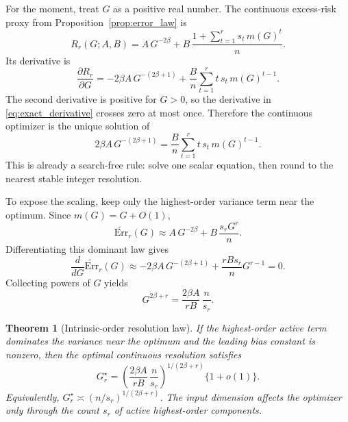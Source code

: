 \documentclass{article}
\newcommand{\Err}{\mathrm{Err}}
\newtheorem{theorem}{Theorem}
\begin{document}
For the moment, treat $G$ as a positive real number. The continuous excess-risk proxy from Proposition~\ref{prop:error_law} is
\begin{equation}
    R_r(G;A,B)=A\,G^{-2\beta}+B\,\frac{1+\sum_{t=1}^{r}s_t\,m(G)^t}{n}.
    \label{eq:exact_proxy_risk}
\end{equation}
Its derivative is
\begin{equation}
    \frac{\partial R_r}{\partial G}
    = -2\beta A\,G^{-(2\beta+1)}
      + \frac{B}{n}\sum_{t=1}^{r} t\,s_t\,m(G)^{t-1}.
    \label{eq:exact_derivative}
\end{equation}
The second derivative is positive for $G>0$, so the derivative in \eqref{eq:exact_derivative} crosses zero at most once. Therefore the continuous optimizer is the unique solution of
\begin{equation}
    2\beta A\,G^{-(2\beta+1)}
    = \frac{B}{n}\sum_{t=1}^{r} t\,s_t\,m(G)^{t-1}.
    \label{eq:root_equation}
\end{equation}
This is already a search-free rule: solve one scalar equation, then round to the nearest stable integer resolution.

To expose the scaling, keep only the highest-order variance term near the optimum. Since $m(G)=G+O(1)$,
\begin{equation}
    \widetilde{\Err}_r(G) \approx A\,G^{-2\beta}+B\,\frac{s_rG^r}{n}.
    \label{eq:dominant_law}
\end{equation}
Differentiating this dominant law gives
\begin{equation}
    \frac{d}{dG}\widetilde{\Err}_r(G)
    \approx -2\beta A\,G^{-(2\beta+1)}+\frac{rB s_r}{n}G^{r-1}=0.
    \label{eq:derivative}
\end{equation}
Collecting powers of $G$ yields
\[
    G^{2\beta+r}=\frac{2\beta A}{rB}\,\frac{n}{s_r}.
\]

\begin{theorem}[Intrinsic-order resolution law]
\label{thm:resolution_law}
If the highest-order active term dominates the variance near the optimum and the leading bias constant is nonzero, then the optimal continuous resolution satisfies
\begin{equation}
    G_r^\star
    = \left(\frac{2\beta A}{rB}\,\frac{n}{s_r}\right)^{1/(2\beta+r)}\{1+o(1)\}.
    \label{eq:grstar}
\end{equation}
Equivalently, $G_r^\star\asymp (n/s_r)^{1/(2\beta+r)}$. The input dimension affects the optimizer only through the count $s_r$ of active highest-order components.
\end{theorem}
\end{document}
